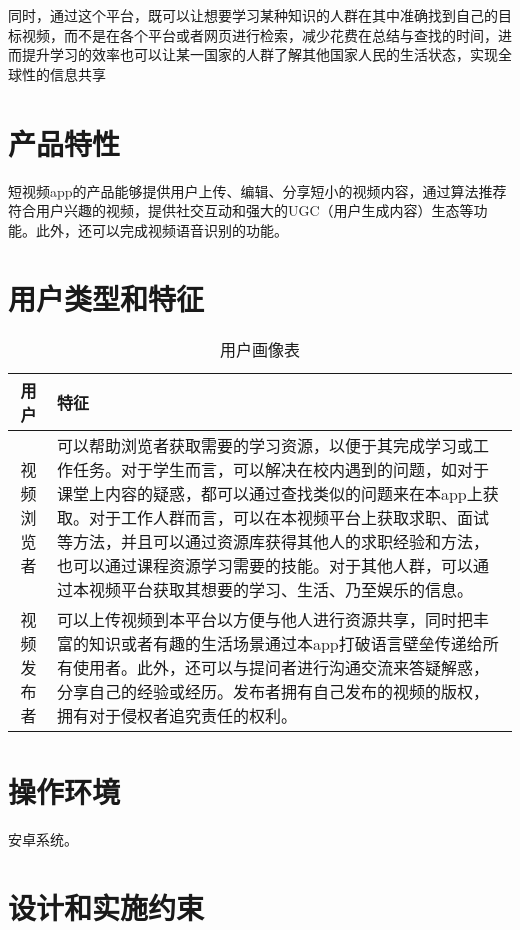 同时，通过这个平台，既可以让想要学习某种知识的人群在其中准确找到自己的目标视频，而不是在各个平台或者网页进行检索，减少花费在总结与查找的时间，进而提升学习的效率也可以让某一国家的人群了解其他国家人民的生活状态，实现全球性的信息共享

\section{产品特性}

短视频app的产品能够提供用户上传、编辑、分享短小的视频内容，通过算法推荐符合用户兴趣的视频，提供社交互动和强大的UGC（用户生成内容）生态等功能。此外，还可以完成视频语音识别的功能。

\section{用户类型和特征}

\begin{table}[tbp]
    \begin{center}
        \caption{用户画像表}
        \begin{tabularx}{\linewidth}{c|X}
            \hline
            \textbf{用户} & \textbf{特征} \\
            \hline
            视频浏览者 & 可以帮助浏览者获取需要的学习资源，以便于其完成学习或工作任务。对于学生而言，可以解决在校内遇到的问题，如对于课堂上内容的疑惑，都可以通过查找类似的问题来在本app上获取。对于工作人群而言，可以在本视频平台上获取求职、面试等方法，并且可以通过资源库获得其他人的求职经验和方法，也可以通过课程资源学习需要的技能。对于其他人群，可以通过本视频平台获取其想要的学习、生活、乃至娱乐的信息。 \\
            \hline
            视频发布者 & 可以上传视频到本平台以方便与他人进行资源共享，同时把丰富的知识或者有趣的生活场景通过本app打破语言壁垒传递给所有使用者。此外，还可以与提问者进行沟通交流来答疑解惑，分享自己的经验或经历。发布者拥有自己发布的视频的版权，拥有对于侵权者追究责任的权利。\\
            \hline
        \end{tabularx}
    \end{center}
\end{table}


\section{操作环境}

安卓系统。

\section{设计和实施约束}

